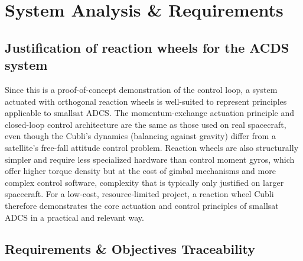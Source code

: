 \section{System Analysis \& Requirements}



\subsection{Justification of reaction wheels for the ACDS system}
\label{sec:tradeoff}


Since this is a proof-of-concept demonstration of the control loop, a system actuated with orthogonal reaction wheels is well-suited to represent principles applicable to smallsat ADCS. The momentum-exchange actuation principle and closed-loop control architecture are the same as those used on real spacecraft, even though the Cubli's dynamics (balancing against gravity) differ from a satellite's free-fall attitude control problem. Reaction wheels are also structurally simpler and require less specialized hardware than control moment gyros, which offer higher torque density but at the cost of gimbal mechanisms and more complex control software, complexity that is typically only justified on larger spacecraft. For a low-cost, resource-limited project, a reaction wheel Cubli therefore demonstrates the core actuation and control principles of smallsat ADCS in a practical and relevant way.

\subsection{Requirements \& Objectives Traceability}
\label{sec:requirements}

